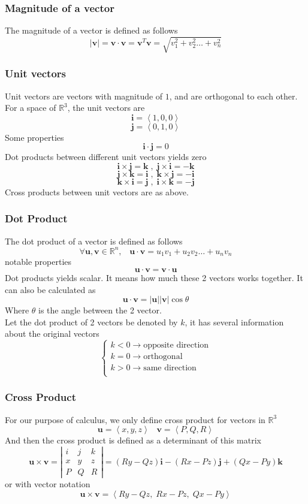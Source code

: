 \documentclass[12pt]{book}
\newcommand{\R}{\mathbb{R}}
\newcommand{\paren}[1]{\left( #1 \right)}
\newcommand{\tribkt}[1]{\left< #1 \right>}
\newcommand{\abso}[1]{\left|#1 \right|}
\begin{document}
\subsubsection{Magnitude of a vector}
The magnitude of a vector is defined as follows
\[
\abso{\textbf{v}}=\textbf{v} \cdot \textbf{v} = \textbf{v}^T\textbf{v}=\sqrt{v_1^2 +v_2^2\ldots +v_n^2}
\]
\subsubsection{Unit vectors}
Unit vectors are vectors with magnitude of $1$, and are orthogonal to each other. For a space of $\R^3$, the unit vectors are
\[
\textbf{i} = \tribkt{1,0,0}
\]
\[
\textbf{j} = \tribkt{0,1,0}
\]
Some properties
\[
\textbf{i}\cdot \textbf{j} = 0
\]
Dot products between different unit vectors yields zero
\[
\textbf{i} \times \textbf{j} = \textbf{k} \;,\; \textbf{j} \times \textbf{i} = -\textbf{k}
\]
\[
\textbf{j} \times \textbf{k} = \textbf{i} \;,\; \textbf{k} \times \textbf{j} = -\textbf{i}
\]
\[
\textbf{k} \times \textbf{i} = \textbf{j} \;,\; \textbf{i} \times \textbf{k} = -\textbf{j}
\]
Cross products between unit vectors are as above. 

\subsubsection{Dot Product}
The dot product of a vector is defined as follows
\[
\forall \textbf{u},\textbf{v} \in \R^n, \;\;\; \textbf{u}\cdot \textbf{v} = u_1v_1 + u_2v_2 \ldots + u_nv_n
\]
notable properties
\[
\textbf{u}\cdot \textbf{v} = \textbf{v} \cdot \textbf{u}
\]
Dot products yields scalar. It means how much these 2 vectors works together. It can also be calculated as
\[
\textbf{u}\cdot \textbf{v} = |\textbf{u}||\textbf{v}|\cos{\theta}
\]
Where $\theta$ is the angle between the 2 vector.\\
\newline
Let the dot product of 2 vectors be denoted by $k$, it has several information about the original vectors
\[
\begin{cases}
    k<0 \rightarrow \text{opposite direction}\\
    k=0 \rightarrow \text{orthogonal}\\
    k>0 \rightarrow \text{same direction}\\
\end{cases}
\]

\subsubsection{Cross Product}
For our purpose of calculus, we only define cross product for vectors in $\R^3$
\[
\textbf{u} = \tribkt{x,y,z} \;\;\; \textbf{v} = \tribkt{P,Q,R}
\]
And then the cross product is defined as a determinant of this matrix
\[
\textbf{u} \times \textbf{v} = 
\abso{
\begin{matrix}
    i&j&k\\
    x&y&z\\
    P&Q&R
\end{matrix}
}= \paren{Ry-Qz}\textbf{i} - \paren{Rx-Pz}\textbf{j} + \paren{Qx-Py}\textbf{k}
\]
or with vector notation
\[
\textbf{u}\times\textbf{v}=\tribkt{Ry-Qz,\; Rx-Pz,\; Qx-Py}
\]
\end{document}

